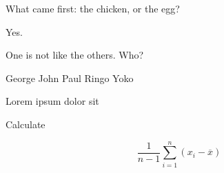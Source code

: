 \documentclass[english]{hogent-exam}
\begin{document}
\maketitle





\begin{questions}

\framedsolutions
\ifsolution
  \printanswers
\else
  \noprintanswers
  \newpage
\fi


\question[10] What came first: the chicken, or the egg?

\begin{solutionordottedlines}[2cm]
  Yes.
\end{solutionordottedlines}

\question[1] One is not like the others. Who?

\begin{oneparcheckboxes}
  \choice George
  \choice John
  \choice Paul
  \choice Ringo
  \CorrectChoice Yoko
\end{oneparcheckboxes}

\question[1] Lorem ipsum dolor sit \fillin[amet][5cm]

\question[1] Calculate

\[ \frac{1}{n-1} \sum\limits_{i=1}^{n} (x_i - \overline{x}) \]

\end{questions}

\ScratchNotes
\end{document}
